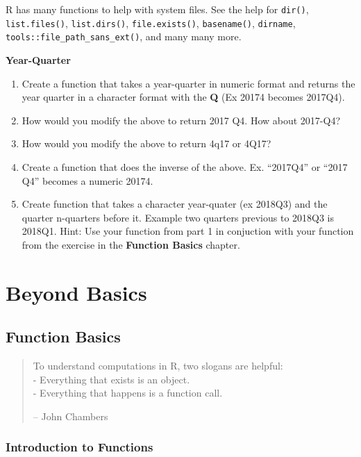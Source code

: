 \documentclass[]{book}
\providecommand{\tightlist}{%
  \setlength{\itemsep}{0pt}\setlength{\parskip}{0pt}}
\let\BeginKnitrBlock\begin \let\EndKnitrBlock\end
\begin{document}
\BeginKnitrBlock{rmdtip}
R has many functions to help with system files. See the help for
\texttt{dir()}, \texttt{list.files()}, \texttt{list.dirs()},
\texttt{file.exists()}, \texttt{basename()}, \texttt{dirname},
\texttt{tools::file\_path\_sans\_ext()}, and many many more.
\EndKnitrBlock{rmdtip}

\textbf{Year-Quarter}

\begin{enumerate}
\def\labelenumi{\arabic{enumi}.}
\tightlist
\item
  Create a function that takes a year-quarter in numeric format and
  returns the year quarter in a character format with the \textbf{Q} (Ex
  20174 becomes 2017Q4).
\item
  How would you modify the above to return 2017 Q4. How about 2017-Q4?
\item
  How would you modify the above to return 4q17 or 4Q17?
\item
  Create a function that does the inverse of the above. Ex. ``2017Q4''
  or ``2017 Q4'' becomes a numeric 20174.
\item
  Create function that takes a character year-quater (ex 2018Q3) and the
  quarter n-quarters before it. Example two quarters previous to 2018Q3
  is 2018Q1. Hint: Use your function from part 1 in conjuction with your
  function from the exercise in the \textbf{Function Basics} chapter.
\end{enumerate}

\part{Beyond Basics}\label{part-beyond-basics}

\chapter{Function Basics}\label{function-basics}

\begin{quote}
To understand computations in R, two slogans are helpful:\\
- Everything that exists is an object.\\
- Everything that happens is a function call.

-- John Chambers
\end{quote}

\section{Introduction to Functions}\label{introduction-to-functions}
\end{document}
